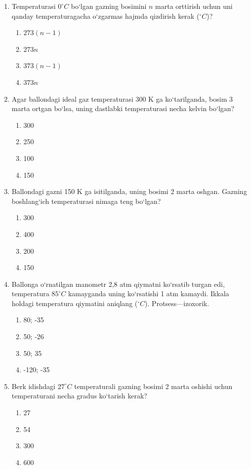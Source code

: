 \begin{enumerate}
\item Temperaturasi $0^\circ C$ bo‘lgan gazning bosimini $n$ marta orttirish uchun uni qanday temperaturagacha o‘zgarmas hajmda qizdirish kerak ($^\circ C$)?
\begin{enumerate}[label=\Alph*)]
\item $273(n-1)$
\item $273n$
\item $373(n-1)$
\item $373n$
\end{enumerate}

\item Agar ballondagi ideal gaz temperaturasi 300 K ga ko‘tarilganda, bosim 3 marta ortgan bo‘lsa, uning dastlabki temperaturasi necha kelvin bo‘lgan?
\begin{enumerate}[label=\Alph*)]
\item 300
\item 250
\item 100
\item 150
\end{enumerate}

\item Ballondagi gazni 150 K ga isitilganda, uning bosimi 2 marta oshgan. Gazning boshlang‘ich temperaturasi nimaga teng bo‘lgan?
\begin{enumerate}[label=\Alph*)]
\item 300
\item 400
\item 200
\item 150
\end{enumerate}

\item Ballonga o‘rnatilgan manometr 2,8 atm qiymatni ko‘rsatib turgan edi, temperatura $85^\circ C$ kamayganda uning ko‘rsatishi 1 atm kamaydi. Ikkala holdagi temperatura qiymatini aniqlang ($^\circ C$). Protsess—izoxorik.
\begin{enumerate}[label=\Alph*)]
\item 80; -35
\item 50; -26
\item 50; 35
\item -120; -35
\end{enumerate}

\item Berk idishdagi $27^\circ C$ temperaturali gazning bosimi 2 marta oshishi uchun temperaturani necha gradus ko‘tarish kerak?
\begin{enumerate}[label=\Alph*)]
\item 27
\item 54
\item 300
\item 600
\end{enumerate}


\end{enumerate}
